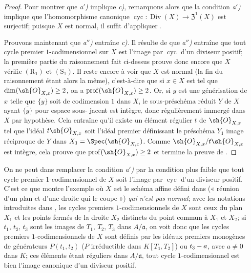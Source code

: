 \begin{proof}
Pour montrer que \emph{a$'$)} implique \emph{c)}, remarquons alors que la condition \emph{a$'$)} implique que l'homomorphisme canonique $\operatorname{cyc}:\operatorname{Div}(X)\to\mathfrak{Z}^1(X)$ est surjectif;
puisque $X$ est normal, il suffit d'appliquer .

Prouvons maintenant que \emph{a$''$)} entraîne \emph{c)}.
Il résulte de  que \emph{a$''$)} entraîne que tout cycle premier $1$-codimensionnel sur $X$ est l'image par $\operatorname{cyc}$ d'un diviseur positif;
la première partie du raisonnement fait ci-dessus prouve donc encore que $X$ vérifie $(\mathrm{R}_1)$ et $(\mathrm{S}_1)$.
Il reste encore à voir que $X$ est normal (la fin du raisonnement étant alors la même), c'est-à-dire que si $x\in X$ est tel que $\dim(\sh{O}_{X,x})\geq2$, on a $\operatorname{prof}(\sh{O}_{X,x})\geq2$.
Or, si $y$ est une générisation de $x$ telle que $\overline{\{y\}}$ soit de codimension $1$ dans $X$, le sous-préschéma réduit $Y$ de $X$ ayant $\overline{\{y\}}$ pour espace
sous-%
jacent est intègre, donc régulièrement immergé dans $X$ par hypothèse.
Cela entraîne qu'il existe un élément régulier $t$ de $\sh{O}_{X,x}$ tel que l'idéal $t\sh{O}_{X,x}$ soit l'idéal premier définissant le préschéma $Y_1$ image réciproque de $Y$ dans $X_1=\Spec(\sh{O}_{X,x})$.
Comme $\sh{O}_{X,x}/t\sh{O}_{X,x}$ est intègre, cela prouve que $\operatorname{prof}(\sh{O}_{X,x})\geq2$ et termine la preuve de .
\end{proof}

\begin{remark}[21.7.5]
\label{IV.21.7.5}
On ne peut dans  remplacer la condition \emph{a$'$)} par la condition plus faible que tout cycle premier $1$-codimensionnel de $X$ soit l'image par $\operatorname{cyc}$ d'un diviseur positif.
C'est ce que montre l'exemple où $X$ est le schéma affine défini dans  (« réunion d'un plan et d'une droite qui le coupe ») \emph{qui n'est pas normal};
avec les notations introduites dans , les cycles premiers $1$-codimensionnels de $X$ sont ceux du plan $X_1$ et les points fermés de la droite $X_2$ distincts du point commun à $X_1$ et $X_2$;
si $t_1$, $t_2$, $t_3$ sont les images de $T_1$, $T_2$, $T_3$ dans $A/\mathfrak a$, on voit donc que les cycles premiers $1$-codimensionnels de $X$ sont définis par les idéaux premiers monogènes de générateurs $P(t_1,t_2)$ ($P$ irréductible dans $K[T_1,T_2]$) ou $t_3- a$, avec $a\neq0$ dans $K$;
ces éléments étant réguliers dans $A/\mathfrak a$, tout cycle $1$-codimensionnel est bien l'image canonique d'un diviseur positif.
\end{remark}

